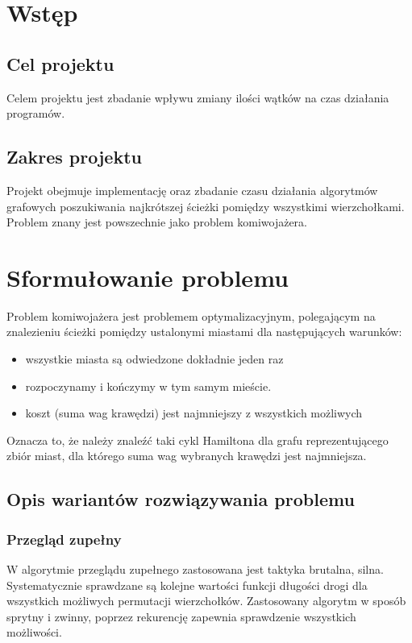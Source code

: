 \documentclass{article}
\begin{document}
	
	

\tableofcontents

\newpage
	
\listoffigures
\newpage

\listoftables	
\newpage

	
	
\section{Wstęp}
	\subsection{Cel projektu}
		Celem projektu jest zbadanie wpływu zmiany ilości wątków na czas działania programów.
	\subsection {Zakres projektu}
	Projekt obejmuje implementację oraz zbadanie czasu działania algorytmów grafowych poszukiwania najkrótszej ścieżki pomiędzy wszystkimi wierzchołkami. Problem znany jest powszechnie jako problem komiwojażera.
	\newpage
\section{Sformułowanie problemu}
		Problem komiwojażera jest problemem optymalizacyjnym, polegającym na znalezieniu ścieżki pomiędzy ustalonymi miastami dla następujących warunków: 
		\begin{itemize}
			\item wszystkie miasta są odwiedzone dokładnie jeden raz
			\item rozpoczynamy i kończymy w tym samym mieście.
			\item koszt (suma wag krawędzi) jest najmniejszy z wszystkich możliwych
		\end{itemize}
		Oznacza to, że należy znaleźć taki cykl Hamiltona dla grafu reprezentującego zbiór miast, dla którego suma wag wybranych krawędzi jest najmniejsza.
		
	\subsection{Opis wariantów rozwiązywania problemu}	
		\subsubsection{Przegląd zupełny}
				W algorytmie przeglądu zupełnego zastosowana jest taktyka brutalna, silna. Systematycznie sprawdzane są kolejne wartości funkcji długości drogi dla wszystkich możliwych permutacji wierzchołków. Zastosowany algorytm w sposób sprytny i zwinny, poprzez rekurencję zapewnia sprawdzenie wszystkich możliwości.
\end{document}
